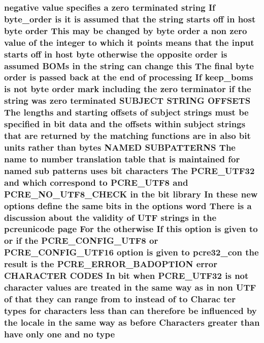 \subsubsection[{\texorpdfstring{type}{type}}]{ negative {\bf value} specifies {\bf a} {\bf zero} terminated {\bf string} If byte\+\_\+order {\bf is} {\bf it} {\bf is} assumed that the {\bf string} starts off {\bf in} {\bf host} byte {\bf order} This may {\bf be} changed by byte {\bf order} {\bf a} non {\bf zero} {\bf value} {\bf of} the integer {\bf to} {\bf which} {\bf it} points means that the {\bf input} starts off {\bf in} {\bf host} byte otherwise the opposite {\bf order} {\bf is} assumed B\+O\+Ms {\bf in} the {\bf string} {\bf can} change {\bf this} The final byte {\bf order} {\bf is} passed back at the {\bf end} {\bf of} processing If keep\+\_\+boms {\bf is} {\bf not} byte {\bf order} {\bf mark} including the {\bf zero} terminator {\bf if} the {\bf string} was {\bf zero} terminated S\+U\+B\+J\+E\+CT {\bf S\+T\+R\+I\+NG} O\+F\+F\+S\+E\+TS The lengths and starting {\bf offsets} {\bf of} subject {\bf strings} must {\bf be} {\bf specified} {\bf in} {\bf bit} {\bf data} and the {\bf offsets} within subject {\bf strings} that {\bf are} returned by the {\bf matching} {\bf functions} {\bf are} {\bf in} also {\bf bit} {\bf units} rather {\bf than} {\bf bytes} N\+A\+M\+ED S\+U\+B\+P\+A\+T\+T\+E\+R\+NS The {\bf name} {\bf to} {\bf number} translation {\bf table} that {\bf is} maintained for named sub {\bf patterns} uses {\bf bit} {\bf characters} The {\bf P\+C\+R\+E\+\_\+\+U\+T\+F32} and {\bf which} correspond {\bf to} {\bf P\+C\+R\+E\+\_\+\+U\+T\+F8} and {\bf P\+C\+R\+E\+\_\+\+N\+O\+\_\+\+U\+T\+F8\+\_\+\+C\+H\+E\+CK} {\bf in} the {\bf bit} {\bf library} In these new {\bf options} define the same bits {\bf in} the {\bf options} {\bf word} There {\bf is} {\bf a} discussion about the validity {\bf of} U\+TF {\bf strings} {\bf in} the pcreunicode page For the otherwise If {\bf this} {\bf option} {\bf is} {\bf given} {\bf to} {\bf or} {\bf if} the {\bf P\+C\+R\+E\+\_\+\+C\+O\+N\+F\+I\+G\+\_\+\+U\+T\+F8} {\bf or} {\bf P\+C\+R\+E\+\_\+\+C\+O\+N\+F\+I\+G\+\_\+\+U\+T\+F16} {\bf option} {\bf is} {\bf given} {\bf to} pcre32\+\_\+con the {\bf result} {\bf is} the {\bf P\+C\+R\+E\+\_\+\+E\+R\+R\+O\+R\+\_\+\+B\+A\+D\+O\+P\+T\+I\+ON} {\bf error} C\+H\+A\+R\+A\+C\+T\+ER C\+O\+D\+ES In {\bf bit} when {\bf P\+C\+R\+E\+\_\+\+U\+T\+F32} {\bf is} {\bf not} {\bf character} {\bf values} {\bf are} treated {\bf in} the same {\bf way} {\bf as} {\bf in} non U\+TF {\bf of} that they {\bf can} range {\bf from} {\bf to} instead {\bf of} {\bf to} Charac ter {\bf types} for {\bf characters} less {\bf than} {\bf can} {\bf therefore} {\bf be} influenced by the {\bf locale} {\bf in} the same {\bf way} {\bf as} before Characters greater {\bf than} have only one and no type}\hypertarget{group__APACHE__CORE__HTTPD_gaafc7089562892428c4fcae486f171f5a}{}\label{group__APACHE__CORE__HTTPD_gaafc7089562892428c4fcae486f171f5a}
